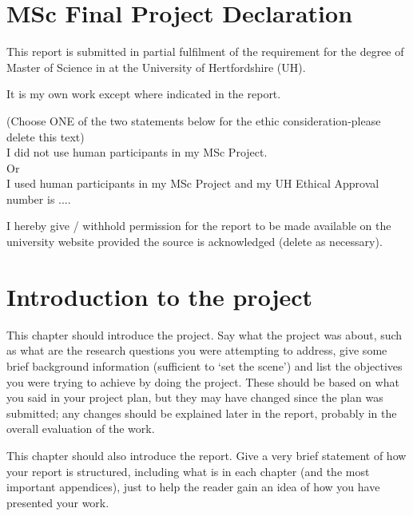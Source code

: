 \documentclass[a4paper, notitlepage, 11pt]{article}
\newcommand{\moduletitle}{Advanced Computer Science}
\begin{document}
\section*{MSc Final Project Declaration}
This report is submitted in partial fulfilment of the requirement for the degree of Master of 
Science in \text{ \moduletitle } at the University of Hertfordshire (UH). \par

It is my own work except where indicated in the report.  \par

(Choose    ONE    of the two statements below for the ethic consideration-please delete this text) \\
I did not use human participants in my MSc Project. \\
Or \\
I used human participants in my MSc Project and my UH Ethical Approval number is  ....\par
 
I hereby give / withhold permission for the report to be made available on the university 
website provided the source is acknowledged (delete as necessary). \par

\vspace{3em}

\tableofcontents

\section{Introduction to the project}

This chapter should introduce the project. Say what the project was about, such as what are the research  questions  you  were  attempting  to  address,  give  some  brief  background  information (sufficient to ‘set the scene’) and list the objectives  you were trying  to achieve by doing  the project.  These  should  be  based  on  what  you  said  in  your  project  plan,  but  they  may  have changed  since  the  plan  was  submitted;  any  changes  should  be  explained  later  in  the  report, probably in the overall evaluation of the work.  

This chapter should also introduce the report. Give a very brief statement of how your report is  structured,  including  what  is  in  each  chapter  (and  the  most  important  appendices),  just  to help the reader gain an idea of how you have presented your work.  
\end{document}
